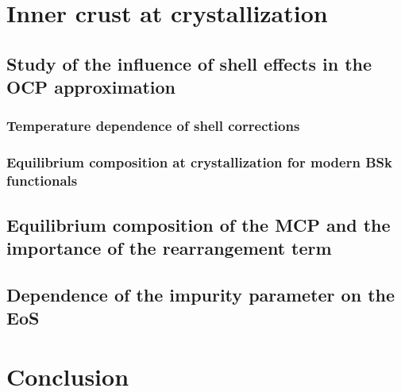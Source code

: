 \section{Inner crust at crystallization}

\subsection{Study of the influence of shell effects in the OCP approximation}

\subsubsection{Temperature dependence of shell corrections}

\subsubsection{Equilibrium composition at crystallization for modern BSk 
functionals}

\subsection{Equilibrium composition of the MCP and the importance of the
rearrangement term}

\subsection{Dependence of the impurity parameter on the EoS}

\section{Conclusion}
